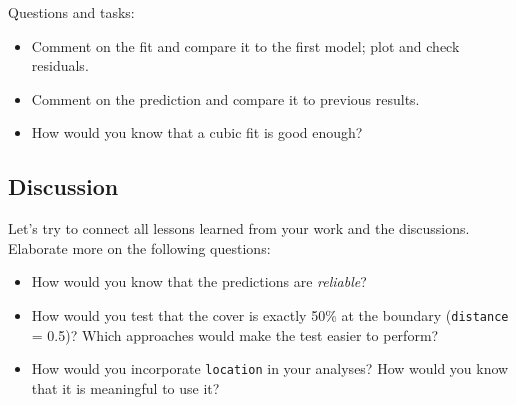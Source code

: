 \documentclass[
]{article}
\providecommand{\tightlist}{%
  \setlength{\itemsep}{0pt}\setlength{\parskip}{0pt}}
\begin{document}
Questions and tasks:

\begin{itemize}
\tightlist
\item
  Comment on the fit and compare it to the first model; plot and check
  residuals.
\item
  Comment on the prediction and compare it to previous results.
\item
  How would you know that a cubic fit is good enough?
\end{itemize}

\hypertarget{discussion}{%
\subsection{Discussion}\label{discussion}}

Let's try to connect all lessons learned from your work and the
discussions. Elaborate more on the following questions:

\begin{itemize}
\tightlist
\item
  How would you know that the predictions are \emph{reliable}?
\item
  How would you test that the cover is exactly 50\% at the boundary
  (\texttt{distance} = 0.5)? Which approaches would make the test easier
  to perform?
\item
  How would you incorporate \texttt{location} in your analyses? How
  would you know that it is meaningful to use it?
\end{itemize}
\end{document}
